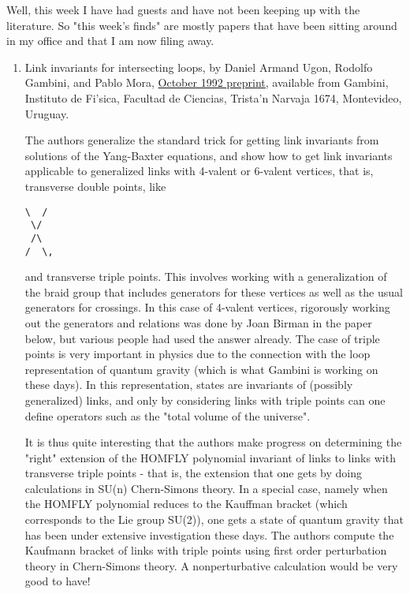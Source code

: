 

Well, this week I have had guests and have not been keeping up with the literature. So "this week's finds" are mostly papers that have been sitting around in my office and that I am now filing away.

\begin{enumerate}
\item Link invariants for intersecting loops, by Daniel Armand Ugon, Rodolfo Gambini, and Pablo Mora, \href{http://cds.cern.ch/record/566149/files/9212137.pdf}{October 1992 preprint}, available from Gambini, Instituto de Fi'sica, Facultad de Ciencias, Trista'n Narvaja 1674, Montevideo, Uruguay.

The authors generalize the standard trick for getting link invariants from solutions of the Yang-Baxter equations, and show how to get link invariants applicable to generalized links with 4-valent or 6-valent vertices, that is, transverse double points, like
\begin{verbatim}
\  /
 \/
 /\
/  \,
\end{verbatim}
and transverse triple points. This involves working with a generalization of the braid group that includes generators for these vertices as well as the usual generators for crossings. In this case of 4-valent vertices, rigorously working out the generators and relations was done by Joan Birman in the paper below, but various people had used the answer already. The case of triple points is very important in physics due to the connection with the loop representation of quantum gravity (which is what Gambini is working on these days). In this representation, states are invariants of (possibly generalized) links, and only by considering links with triple points can one define operators such as the "total volume of the universe".

It is thus quite interesting that the authors make progress on determining the "right" extension of the HOMFLY polynomial invariant of links to links with transverse triple points - that is, the extension that one gets by doing calculations in SU(n) Chern-Simons theory. In a special case, namely when the HOMFLY polynomial reduces to the Kauffman bracket (which corresponds to the Lie group SU(2)), one gets a state of quantum gravity that has been under extensive investigation these days. The authors compute the Kaufmann bracket of links with triple points using first order perturbation theory in Chern-Simons theory. A nonperturbative calculation would be very good to have!


\end{enumerate}
